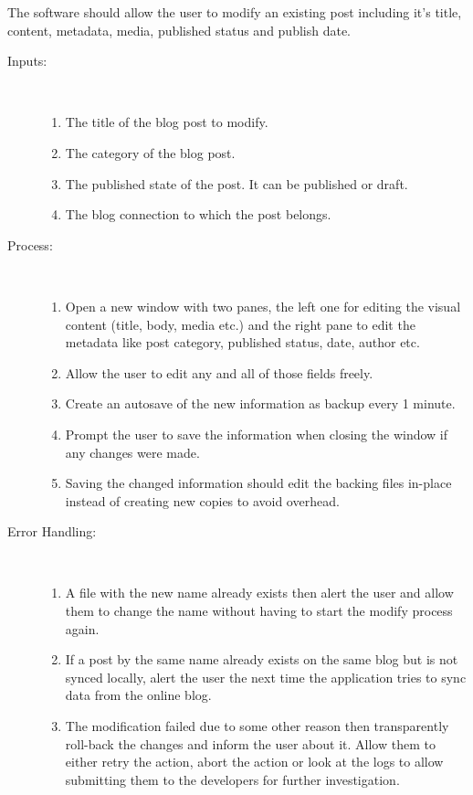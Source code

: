 
The software should allow the user to modify an existing post including it's title, content, metadata, media, published
status and publish date.

\begin{description}
    \item [Inputs:] ~
    \begin{enumerate}[noitemsep]
        \item {The title of the blog post to modify.}
        \item {The category of the blog post.}
        \item {The published state of the post. It can be published or draft.}
        \item {The blog connection to which the post belongs.}
    \end{enumerate}
    \item [Process:] ~
    \begin{enumerate}[noitemsep]
        \item {Open a new window with two panes, the left one for editing the visual content (title, body, media etc.)
               and the right pane to edit the metadata like post category, published status, date, author etc.}
        \item {Allow the user to edit any and all of those fields freely.}
        \item {Create an autosave of the new information as backup every 1 minute.}
        \item {Prompt the user to save the information when closing the window if any changes were made.}
        \item {Saving the changed information should edit the backing files in-place instead of creating new copies to
               avoid overhead.}
    \end{enumerate}
    \item [Error Handling:] ~
    \begin{enumerate}[noitemsep]
        \item {A file with the new name already exists then alert the user and allow them to change the name without
               having to start the modify process again.}
        \item {If a post by the same name already exists on the same blog but is not synced locally, alert the user the
               next time the application tries to sync data from the online blog.}
        \item {The modification failed due to some other reason then transparently roll-back the changes and inform the
               user about it. Allow them to either retry the action, abort the action or look at the logs to allow
               submitting them to the developers for further investigation.}
    \end{enumerate}
\end{description}

